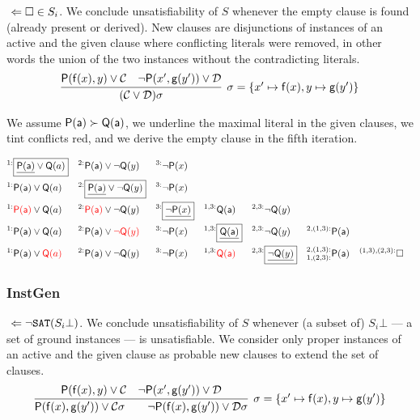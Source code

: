 \jek{} \( \ \Leftarrow\square\in S_i \). We conclude unsatisfiability of \( S \) whenever the empty clause is found (already present or derived).
New clauses are disjunctions of instances of an active and the given clause where conflicting literals were removed,
in other words the union of the two instances without the contradicting literals.
\begin{gather*}
\infer[\sigma=\{ x'\mapsto\mf(x), y\mapsto\mg(y') \}]{
	(\mcC \lor \mcD)\sigma
}{
	\mP(\mf(x), y) \lor \mcC & \lnot\mP(x',\mg(y')) \lor \mcD
}
\end{gather*}

\begin{example} We assume \( \mathsf{P}(\mathsf{a})\succ\mathsf{Q}(\mathsf{a}) \),
	we underline the maximal literal in the given clauses,
	we tint conflicts red,
	 and we derive the empty clause in the fifth iteration.

	\begin{align*}
	^{1:}&\boxed{\underline{\mP(\ma)}\lor\mQ(a)}
	& ^{2:}&\mP(\ma)\lor\lnot\mQ(y) & ^{3:}&\lnot\mP(x)
	\\
	^{1:}&\mP(\ma)\lor\mQ(a)
	& ^{2:}&\boxed{\underline{\mP(\ma)}\lor\lnot\mQ(y)} & ^{3:}&\lnot\mP(x)
	\\
	^{1:}&{\colLo\mP(\ma)}\lor\mQ(a)
	& ^{2:}&{\colLo\mP(\ma)}\lor\lnot\mQ(y)
	& ^{3:}&\boxed{\underline{\lnot\mP(x)}}
	& ^{1,3:}&\mQ(\ma)
	& ^{2,3:}&\lnot\mQ(y)
	\\
	^{1:}&\mP(\ma)\lor\mQ(a)
	& ^{2:}&\mP(\ma)\lor{\colLo\lnot\mQ(y)}
	& ^{3:}&\lnot\mP(x)
	& ^{1,3:}&\boxed{\underline{\mQ(\ma)}}
	& ^{2,3:}&\lnot\mQ(y)
	& ^{2,(1,3):}&\mP(\ma)
	\\
	^{1:}&\mP(\ma)\lor{\colLo\mQ(a)}
	& ^{2:}&\mP(\ma)\lor\lnot\mQ(y)
	& ^{3:}&\lnot\mP(x)
	& ^{1,3:}&\colLo\mQ(\ma)
	& ^{2,3:}&\boxed{\underline{\lnot\mQ(y)}}
	& ^{2,(1,3):}_{1,(2,3):}&\mP(\ma)
	& ^{(1,3),(2,3):}&\emptyclause
	\\
	\end{align*}
\end{example}

\subsubsection{InstGen}

\jek{} \( \ \Leftarrow \lnot\texttt{SAT}(S_i\bot) \). We conclude unsatisfiability of \( S \) whenever (a subset of) \( S_i\bot \) --- a set of ground instances --- is unsatisfiable.
We consider only proper instances of an active and the given clause as probable new clauses to extend the set of clauses.
\begin{gather*}
	\infer[\sigma=\{ x'\mapsto\mf(x), y\mapsto\mg(y') \}]{
		\mP(\mf(x),\mg(y')) \lor\mcC\sigma
		\qquad
		\lnot\mP(\mf(x),\mg(y'))\lor\mcD\sigma
	}{
		\mP(\mf(x), y) \lor \mcC & \lnot\mP(x',\mg(y')) \lor \mcD
	}
\end{gather*}


